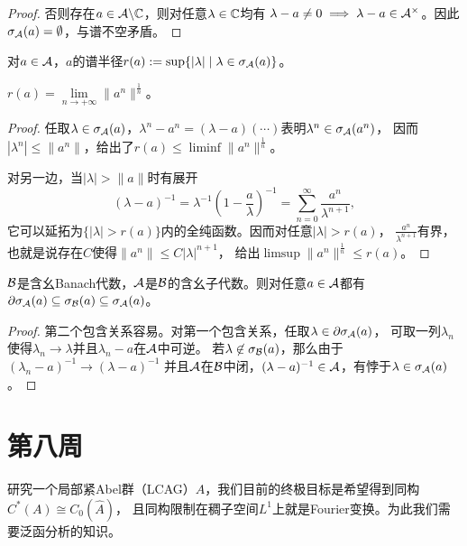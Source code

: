 \begin{proof}
    否则存在$a \in \mathcal{A}\backslash\mathbb{C}$，则对任意$\lambda \in \mathbb{C}$均有
    $\lambda-a \neq 0 \implies \lambda-a \in \mathcal{A}^\times$。因此$\sigma_{\mathcal{A}}(a) = \emptyset$，与谱不空矛盾。
\end{proof}
\begin{definition}
    对$a \in \mathcal{A}$，$a$的谱半径$r(a):=\sup\{|\lambda| \mid \lambda \in \sigma_{\mathcal{A}}(a)\}$。
\end{definition}
\begin{theorem}
    $\displaystyle r(a) = \lim\limits_{n \to +\infty} \|a^n\|^{\frac{1}{n}}$。
\end{theorem}
\begin{proof}
    任取$\lambda \in \sigma_{\mathcal{A}}(a)$，$\lambda^n - a^n = (\lambda - a)(\cdots)$表明$\lambda^n \in \sigma_{\mathcal{A}}(a^n)$，
    因而$|\lambda^n| \leqslant \|a^n\|$，给出了$r(a) \leqslant \liminf \|a^n\|^{\frac{1}{n}}$。

    对另一边，当$|\lambda| > \|a\|$时有展开\[(\lambda - a)^{-1} = \lambda^{-1}(1-\frac{a}{\lambda})^{-1} = \sum_{n = 0}^\infty \frac{a^n}{\lambda^{n+1}},\]
    它可以延拓为$\{|\lambda| > r(a)\}$内的全纯函数。因而对任意$|\lambda| > r(a)$，
    $\displaystyle \frac{a^n}{\lambda^{n+1}}$有界，也就是说存在$C$使得$\|a^n\| \leqslant C|\lambda|^{n+1}$，
    给出$\limsup \|a^n\|^{\frac{1}{n}} \leqslant r(a)$。
\end{proof}
\begin{lemma}
    $\mathcal{B}$是含幺Banach代数，$\mathcal{A}$是$\mathcal{B}$的含幺子代数。则对任意$a \in \mathcal{A}$都有
    $\partial \sigma_{\mathcal{A}}(a) \subseteq \sigma_{\mathcal{B}}(a) \subseteq \sigma_{\mathcal{A}}(a)$。
\end{lemma}
\begin{proof}
    第二个包含关系容易。对第一个包含关系，任取$\lambda \in \partial \sigma_{\mathcal{A}}(a)$，
    可取一列$\lambda_n$使得$\lambda_n \to \lambda$并且$\lambda_n - a$在$\mathcal{A}$中可逆。
    若$\lambda \not\in \sigma_{\mathcal{B}}(a)$，那么由于$(\lambda_n - a)^{-1} \to (\lambda - a)^{-1}$
    并且$\mathcal{A}$在$\mathcal{B}$中闭，$(\lambda - a)^{-1} \in \mathcal{A}$，有悖于$\lambda \in \sigma_{\mathcal{A}}(a)$。
\end{proof}

\section{第八周}
研究一个局部紧Abel群（LCAG）$A$，我们目前的终极目标是希望得到同构$C^*(A) \cong C_0(\hat{A})$，
且同构限制在稠子空间$L^1$上就是Fourier变换。为此我们需要泛函分析的知识。

